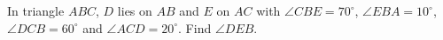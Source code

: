 In triangle $ABC$, $D$ lies on $AB$ and $E$ on $AC$ with $\angle CBE=70^\circ$, $\angle EBA=10^\circ$, $\angle DCB=60^\circ$ and $\angle ACD=20^\circ$. Find $\angle DEB$.
